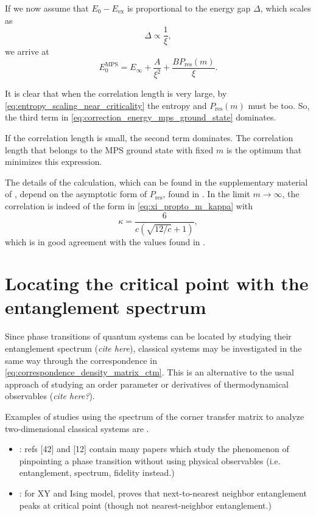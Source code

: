 If we now assume that $E_0 - E_{\text{ex}}$ is proportional to the energy gap $\Delta$, which scales as \cite{lieb1961two, mata1989energy, pfeuty1970one}
\begin{equation}
  \Delta \propto \frac{1}{\xi},
\end{equation}
we arrive at
\begin{equation}\label{eq:correction_energy_mps_ground_state}
  E_{0}^{\text{MPS}} = E_{\infty} + \frac{A}{\xi^2} + \frac{B P_{\text{res}}(m)}{\xi}.
\end{equation}

It is clear that when the correlation length is very large, by \autoref{eq:entropy_scaling_near_criticality} the entropy
and $P_{\text{res}}(m)$ must be too.
So, the third term in \autoref{eq:correction_energy_mps_ground_state} dominates.

If the correlation length is small, the second term dominates.
The correlation length that belongs to the MPS ground state with fixed $m$ is the optimum that minimizes this
expression.

The details of the calculation, which can be found in the supplementary material of \cite{pollmann2009theory},
depend on the asymptotic form of $P_{\text{res}}$, found in \cite{calabrese2008entanglement}. In the limit $m \to \infty$, the correlation is indeed of the form in \autoref{eq:xi_propto_m_kappa} with
\begin{equation}\label{eq:exact_value_kappa}
  \kappa = \frac{6}{c \left( \sqrt{12/c} + 1 \right) },
\end{equation}
which is in good agreement with the values found in \cite{tagliacozzo2008scaling}.


\section{Locating the critical point with the entanglement spectrum}
Since phase transitions of quantum systems can be located by studying their entanglement spectrum (\emph{cite here}),
classical systems may be investigated in the same way through the correspondence in
\autoref{eq:correspondence_density_matrix_ctm}. This is an alternative to the usual approach of studying an order
parameter or derivatives of thermodynamical observables (\emph{cite here?}).

Examples of studies using the spectrum of the corner transfer matrix to analyze two-dimensional classical systems are
\cite{krvcmar2015reentrant, PhysRevE.94.022134, krvcmar2016phase}.


\begin{itemize}
  \item \cite{huang2017holographic}: refs [42] and [12] contain many papers which study the phenomenon of pinpointing
  a phase transition without using physical observables (i.e. entanglement, spectrum, fidelity instead.)
  \item \cite{osborne2002entanglement}: for XY and Ising model, proves that next-to-nearest neighbor entanglement peaks
  at critical point (though not nearest-neighbor entanglement.)
\end{itemize}
